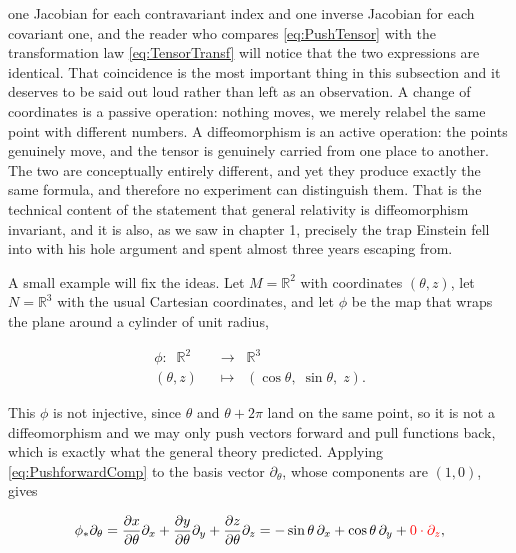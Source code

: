         one Jacobian for each contravariant index and one inverse Jacobian for each covariant one, and the reader who compares \ref{eq:PushTensor} with the transformation law \ref{eq:TensorTransf} will notice that the two expressions are identical. That coincidence is the most important thing in this subsection and it deserves to be said out loud rather than left as an observation. A change of coordinates is a passive operation: nothing moves, we merely relabel the same point with different numbers. A diffeomorphism is an active operation: the points genuinely move, and the tensor is genuinely carried from one place to another. The two are conceptually entirely different, and yet they produce exactly the same formula, and therefore no experiment can distinguish them. That is the technical content of the statement that general relativity is diffeomorphism invariant, and it is also, as we saw in chapter 1, precisely the trap Einstein fell into with his hole argument and spent almost three years escaping from.

        A small example will fix the ideas. Let $M=\mathbb{R}^2$ with coordinates $(\theta,z)$, let $N=\mathbb{R}^3$ with the usual Cartesian coordinates, and let $\phi$ be the map that wraps the plane around a cylinder of unit radius,

        \begin{equation}
            \begin{split}
                \phi: \;\; \mathbb{R}^2 \;\; &\rightarrow \;\; \mathbb{R}^3\\
                (\theta,z) \;\; &\mapsto \;\; \left(\cos\theta,\;\sin\theta,\;z\right).
            \end{split}
        \end{equation}

        This $\phi$ is not injective, since $\theta$ and $\theta+2\pi$ land on the same point, so it is not a diffeomorphism and we may only push vectors forward and pull functions back, which is exactly what the general theory predicted. Applying \ref{eq:PushforwardComp} to the basis vector $\partial_{\theta}$, whose components are $(1,0)$, gives

        \begin{align*}
            \phi_{*}\partial_{\theta} = \frac{\partial x}{\partial\theta}\partial_x + \frac{\partial y}{\partial\theta}\partial_y + \frac{\partial z}{\partial\theta}\partial_z = -\sin\theta\,\partial_x + \cos\theta\,\partial_y + {\color{red}0\cdot\partial_z},
        \end{align*}

